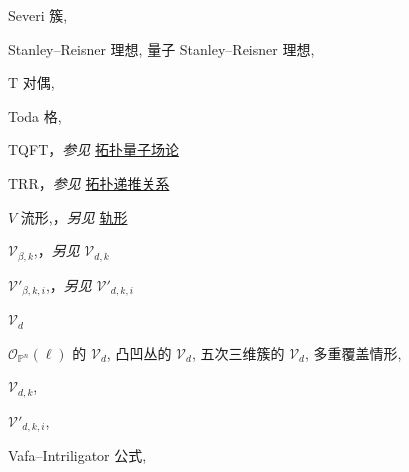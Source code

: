 \begin{theindex}
\indexspace
\item \leavevmode\hypertarget{idx:1247}{Severi 簇},\enspace{}
\indexspace
\item \leavevmode\hypertarget{idx:1284}{Stanley--Reisner 理想},\enspace{}
\subitem \leavevmode\hypertarget{idx:1285}{量子 Stanley--Reisner 理想},\enspace{}
\indexspace
\item \leavevmode\hypertarget{source:491}{}\hypertarget{idx:1325}{T 对偶},\enspace{}
\indexspace
\item \leavevmode\hypertarget{idx:1335}{Toda 格},\enspace{}
\indexspace
\item \leavevmode\hypertarget{idx:1381}{TQFT}，\textit{参见} \hyperlink{idx:1336}{拓扑量子场论}
\indexspace
\item \leavevmode\hypertarget{idx:1382}{TRR}，\textit{参见} \hyperlink{idx:1344}{拓扑递推关系}
\indexspace
\item \leavevmode\hypertarget{idx:1384}{$V$ 流形},\enspace{}，\textit{另见} \hyperlink{idx:0990}{轨形}
\indexspace
\item \leavevmode\hypertarget{idx:1388}{$\mathcal V_{\beta,k}$},\enspace{}，\textit{另见} \hyperlink{idx:1395}{$\mathcal V_{d,k}$}
\indexspace
\item \leavevmode\hypertarget{idx:1389}{$\mathcal V'_{\beta,k,i}$},\enspace{}，\textit{另见} \hyperlink{idx:1396}{$\mathcal V'_{d,k,i}$}
\indexspace
\item \leavevmode\hypertarget{idx:1390}{$\mathcal V_d$}
\subitem \leavevmode\hypertarget{idx:1391}{$\mathcal O_{\mathbb P^n}(\ell)$ 的 $\mathcal V_d$},\enspace{}
\subitem \leavevmode\hypertarget{idx:1392}{凸凹丛的 $\mathcal V_d$},\enspace{}
\subitem \leavevmode\hypertarget{idx:1393}{五次三维簇的 $\mathcal V_d$},\enspace{}
\subsubitem \leavevmode\hypertarget{idx:1394}{多重覆盖情形},\enspace{}
\indexspace
\item \leavevmode\hypertarget{idx:1395}{$\mathcal V_{d,k}$},\enspace{}
\indexspace
\item \leavevmode\hypertarget{idx:1396}{$\mathcal V'_{d,k,i}$},\enspace{}
\indexspace
\item \leavevmode\hypertarget{idx:1386}{Vafa--Intriligator 公式},\enspace{}

\end{theindex}
